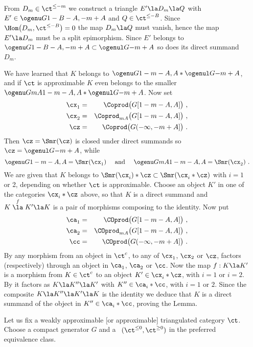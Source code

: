\documentclass[11pt]{amsart}
\begin{document}
From $D_m\in\ct^{\leq -m}$ we construct a triangle
$E'\la D_m\la Q$ with $E'\in\ogenu G{}{1-B-A,-m+A}$
and $Q\in\ct^{\leq-B}$. Since $\Hom\big(D_m,\ct^{\leq-B}\big)=0$ the map
$D_m\la Q$ must vanish, hence
the map $E'\la D_m$ must be a split epimorphism.
Since $E'$ belongs to $\ogenu G{}{1-B-A,-m+A}\subset\ogenul G{}{-m+A}$ so
does its direct summand $D_m$.

We have learned that $K$ belongs to
$\ogenu G{}{1-m-A,A}*\ogenul G{}{-m+A}$,
and if $\ct$ is approximable $K$ even
belongs to the smaller $\ogenu G{mA}{1-m-A,A}*\ogenul G{}{-m+A}$.
Now set
\begin{eqnarray*}
  \cx_1^{}&=&\Coprod\big(G[1-m-A,A]\big)\ ,\\
  \cx_2^{}&=&\Coprod_{mA}^{}\big(G[1-m-A,A]\big)\ ,\\
  \cz&=&\Coprod\big(G(-\infty,-m+A]\big)\ .
\end{eqnarray*}
Then $\cz=\Smr(\cz)$ is closed under direct summands so
$\cz=\ogenul G{}{-m+A}$, while
\[
\ogenu G{}{1-m-A,A}=\Smr(\cx_1^{})\quad\text{ and }\quad\ogenu G{mA}{1-m-A,A}=\Smr(\cx_2^{})\ .
\]
We are given that $K$ belongs to $\Smr(\cx_i^{})*\cz\subset\Smr(\cx_i^{}*\cz)$
with $i=1$ or 2, depending
on whether $\ct$ is approximable.
Choose an object $K'$ in one of
the categories $\cx_i^{}*\cz$ above, so that $K$ is a direct summand
and $K\stackrel f\la K'\la K$ is a pair of morphisms
composing to the identity. Now put
\begin{eqnarray*}
  \ca_1^{}&=&\COprod\big(G[1-m-A,A]\big)\ ,\\
  \ca_2^{}&=&\COprod_{mA}^{}\big(G[1-m-A,A]\big)\ ,\\
  \cc&=&\COprod\big(G(-\infty,-m+A]\big)\ .
\end{eqnarray*}
By \cite[Lemma~1.7]{Neeman17} any morphism from an object in $\ct^c$, to
any of $\cx_1^{}$, $\cx_2$ or $\cz$, factors (respectively)
through an object in $\ca_1^{}$, $\ca_2^{}$ or $\cc$.
Now the map $f:K\la K'$ is a morphism from
$K\in\ct^c$ to an object $K'\in\cx_i^{}*\cz$, with
$i=1$ or $i=2$. By \cite[Lemma~1.5]{Neeman17}
it factors as $K\la K''\la K'$ with $K''\in\ca_i^{}*\cc$,
with $i=1$ or $2$. Since the composite
$K\la K''\la K'\la K$ is the identity we deduce that
$K$ is a direct summand of the object
in $K''\in\ca_i^{}*\cc$, proving the Lemma.
\eprf

Let us fix a weakly approximable [or approximable]
triangulated category $\ct$. Choose a compact
generator $G$ and a \tstr\ $(\ct^{\leq0},\ct^{\geq0})$
in the preferred equivalence class. 
\end{document}
